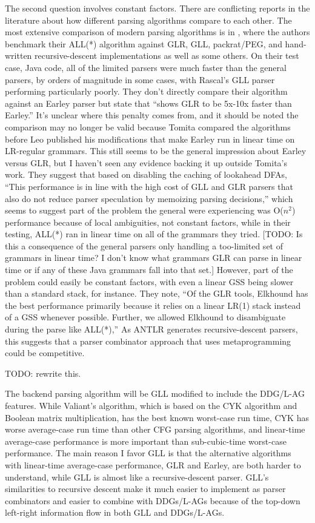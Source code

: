 \documentclass[12pt]{article}
\begin{document}
The second question involves constant factors.  There are conflicting
reports in the literature about how different parsing algorithms
compare to each other.  The most extensive comparison of modern
parsing algorithms is in \textcite{antlr4}, where the authors
benchmark their ALL(*) algorithm against GLR, GLL, packrat/PEG, and
hand-written recursive-descent implementations as well as some others.
On their test case, Java code, all of the limited parsers were much
faster than the general parsers, by orders of magnitude in some cases,
with Rascal's GLL parser performing particularly poorly.  They don't
directly compare their algorithm against an Earley parser but state
that \textcite{tomita1985efficient} ``shows GLR to be 5x-10x faster
than Earley.''  It's unclear where this penalty comes from, and it
should be noted the comparison may no longer be valid because Tomita
compared the algorithms before Leo published his modifications that
make Earley run in linear time on LR-regular grammars.  This still
seems to be the general impression about Earley versus GLR, but I
haven't seen any evidence backing it up outside Tomita's work.  They
suggest that based on disabling the caching of lookahead DFAs, ``This
performance is in line with the high cost of GLL and GLR parsers that
also do not reduce parser speculation by memoizing parsing
decisions,'' which seems to suggest part of the problem the general
were experiencing was O($n^2$) performance because of local
ambiguities, not constant factors, while in their testing, ALL(*) ran
in linear time on all of the grammars they tried.  [TODO: Is this a
consequence of the general parsers only handling a too-limited set of
grammars in linear time?  I don't know what grammars GLR can parse in
linear time or if any of these Java grammars fall into that set.]
However, part of the problem could easily be constant factors, with
even a linear GSS being slower than a standard stack, for instance.
They note, ``Of the GLR tools, Elkhound has the best performance
primarily because it relies on a linear LR(1) stack instead of a GSS
whenever possible.  Further, we allowed Elkhound to disambiguate
during the parse like ALL(*),'' As ANTLR generates recursive-descent
parsers, this suggests that a parser combinator approach that uses
metaprogramming could be competitive.


TODO: rewrite this.

The backend parsing algorithm will be GLL modified to include the
DDG/L-AG features.  While Valiant's algorithm, which is based on the
CYK algorithm and Boolean matrix multiplication, has the best known
worst-case run time, CYK has worse average-case run time than other
CFG parsing algorithms, and linear-time average-case performance is
more important than sub-cubic-time worst-case performance.  The main
reason I favor GLL is that the alternative algorithms with linear-time
average-case performance, GLR and Earley, are both harder to
understand, while GLL is almost like a recursive-descent parser.
GLL's similarities to recursive descent make it much easier to
implement as parser combinators and easier to combine with DDGs/L-AGs
because of the top-down left-right information flow in both GLL and
DDGs/L-AGs.
\end{document}
